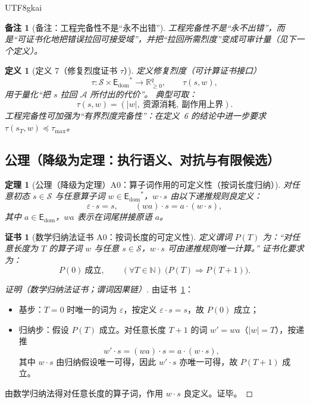 \documentclass[12pt]{article}
\newtheorem{definition}{定义}[section]
\newtheorem{theorem}{定理}[section]
\newtheorem{remark}{备注}[section]
\newtheorem{Certificate}{证书}[section]
\newcommand{\RR}{\ensuremath{\mathbb{R}}}
\newcommand{\NN}{\ensuremath{\mathbb{N}}}
\newcommand{\EDOM}{\ensuremath{\mathsf{E}_{\mathrm{dom}}}}
\begin{document}
\begin{CJK*}{UTF8}{gkai}
\begin{remark}[备注：工程完备性不是“永不出错”]
工程完备性不是“永不出错”，而是“可证书化地把错误拉回可接受域”，并把“拉回所需烈度”变成可审计量（见下一个定义）。
\end{remark}

\begin{definition}[定义 7（修复烈度证书 $\tau$）]
定义修复烈度（可计算证书接口）
\[
  \tau:\mathcal{S}\times\EDOM^{\ast}\to\RR_{\ge 0}^{q},\qquad \tau(s,w),
\]
用于量化“把 $s$ 拉回 $\mathcal{A}$ 所付出的代价”。
典型可取：
\[
  \tau(s,w)=(|w|,\ \text{资源消耗},\ \text{副作用上界}).
\]
工程完备性可加强为“有界烈度完备性”：在定义~6 的结论中进一步要求 $\tau(s_T,w)\preceq \tau_{\max}$。
\end{definition}

\subsection{公理（降级为定理：执行语义、对抗与有限候选）}
\label{subsec:tex25-axioms}

\begin{theorem}[公理（降级为定理）A0：算子词作用的可定义性（按词长度归纳）]
\label{thm:tex25-axiom-a0-word-action}
对任意初态 $s\in\mathcal{S}$ 与任意算子词 $w\in\EDOM^{\ast}$，$w\cdot s$ 由以下递推规则良定义：
\[
  \varepsilon\cdot s=s,\qquad
  (wa)\cdot s=a\cdot(w\cdot s),
\]
其中 $a\in\EDOM$，$wa$ 表示在词尾拼接原语 $a$。
\end{theorem}

\begin{Certificate}[数学归纳法证书 A0：按词长度的可定义性]
\label{cert:tex25-a0-word-action}
定义谓词 $P(T)$ 为：“对任意长度为 $T$ 的算子词 $w$ 与任意 $s\in\mathcal{S}$，$w\cdot s$ 可由递推规则唯一计算。”
证书化要求为：
\[
  P(0)\ \text{成立},\qquad
  (\forall T\in\NN)\ \bigl(P(T)\Rightarrow P(T+1)\bigr).
\]
\end{Certificate}

\begin{proof}[证明（数学归纳法证书；谓词因果链）]
由证书~\ref{cert:tex25-a0-word-action}：
\begin{itemize}
  \item 基步：$T=0$ 时唯一的词为 $\varepsilon$，按定义 $\varepsilon\cdot s=s$，故 $P(0)$ 成立；
  \item 归纳步：假设 $P(T)$ 成立。对任意长度 $T+1$ 的词 $w'=wa$（$|w|=T$），按递推
  \[
    w'\cdot s=(wa)\cdot s=a\cdot(w\cdot s),
  \]
  其中 $w\cdot s$ 由归纳假设唯一可得，因此 $w'\cdot s$ 亦唯一可得，故 $P(T+1)$ 成立。
\end{itemize}
由数学归纳法得对任意长度的算子词，作用 $w\cdot s$ 良定义。证毕。
\end{proof}


\end{CJK*}
\end{document}
